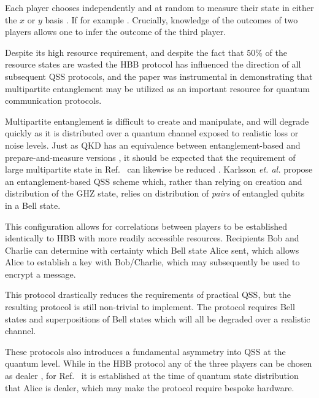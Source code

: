 Each player chooses independently and at random to measure their state in either the $x$ or $y$ basis . If for example .  Crucially, knowledge of the outcomes of two players allows one to infer the outcome of the third player. 

Despite its high resource requirement, and despite the fact that $50\%$ of the resource states are wasted  the HBB protocol has influenced the direction of all subsequent QSS protocols, and the paper was instrumental in demonstrating that multipartite entanglement may be utilized as an important resource for quantum communication protocols. 

Multipartite entanglement is difficult to create and manipulate, and will degrade quickly as it is distributed over a quantum channel exposed to realistic loss or noise levels. Just as QKD has an equivalence between entanglement-based and prepare-and-measure versions , it should be expected that the requirement of large multipartite state in Ref.~\cite{Hillery1999} can likewise be reduced \cite{Karlsson1999, Tittel2001, Zhang2005b, Williams2019}. Karlsson \emph{et. al.} \cite{Karlsson1999} propose an entanglement-based QSS scheme which, rather than relying on creation and distribution of the GHZ state, relies on distribution of \emph{pairs} of entangled qubits in a Bell state. 

This configuration allows for correlations between players to be established identically to HBB with more readily accessible resources. Recipients Bob and Charlie can determine with certainty which Bell state Alice sent, which allows Alice to establish a key with Bob/Charlie, which may subsequently be used to encrypt a message. 

This protocol drastically reduces the requirements of practical QSS, but the resulting protocol is still non-trivial to implement. The protocol requires Bell states and superpositions of Bell states which will all be degraded over a realistic channel. 

These protocols also introduces a fundamental asymmetry into QSS at the quantum level. While in the HBB protocol any of the three players can be chosen as dealer , for Ref.~\cite{Karlsson1999} it is established at the time of quantum state distribution that Alice is dealer, which may make the protocol require bespoke hardware.

